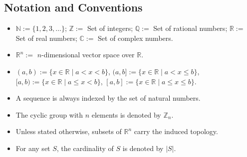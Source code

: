 \documentclass[11pt, a4paper]{article}
\begin{document}
\subsection*{Notation and Conventions}
\begin{itemize}
  \item $\mathbb{N} := \{1, 2, 3, \dots\}$; $\mathbb{Z} :=$ Set of integers; $\mathbb{Q} :=$ Set of rational numbers; $\mathbb{R} :=$ Set of real numbers; $\mathbb{C} :=$ Set of complex numbers.
  \item $\mathbb{R}^n :=$ $n$-dimensional vector space over $\mathbb{R}$.
  \item $(a, b) := \{x \in \mathbb{R} \mid a < x < b\}$, $(a, b] := \{x \in \mathbb{R} \mid a < x \le b\}$, $[a, b) := \{x \in \mathbb{R} \mid a \le x < b\}$, $[a, b] := \{x \in \mathbb{R} \mid a \le x \le b\}$.
  \item A sequence is always indexed by the set of natural numbers.
  \item The cyclic group with $n$ elements is denoted by $\mathbb{Z}_n$.
  \item Unless stated otherwise, subsets of $\mathbb{R}^n$ carry the induced topology.
  \item For any set $S$, the cardinality of $S$ is denoted by $|S|$.
\end{itemize}
\end{document}

